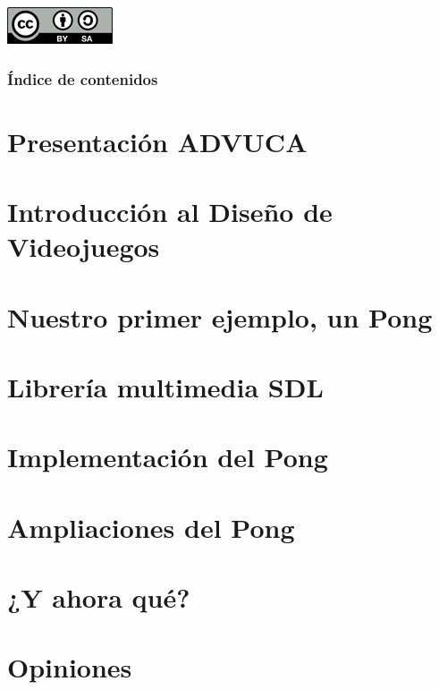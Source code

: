 \documentclass{beamer}
\begin{document}
\begin{frame}
    \begin{center}
        \includegraphics[scale=1]{img/cc.png}
    \end{center}    
\end{frame}

\begin{frame}
	\frametitle{Índice de contenidos}
	\tableofcontents
\end{frame}



\section{Presentación ADVUCA}



\section{Introducción al Diseño de Videojuegos}


\section{Nuestro primer ejemplo, un Pong}


\section{Librería multimedia SDL}


\section{Implementación del Pong}


\section{Ampliaciones del Pong}


\section{¿Y ahora qué?}


\section{Opiniones}

\end{document}
